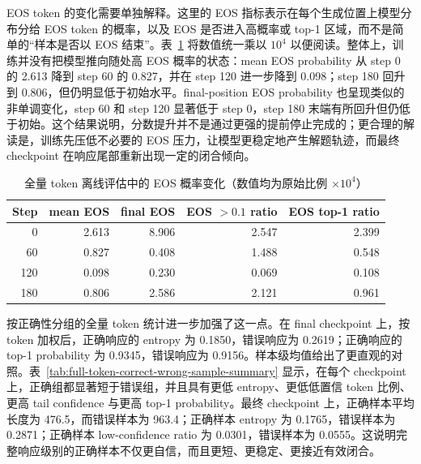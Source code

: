 EOS token 的变化需要单独解释。这里的 EOS 指标表示在每个生成位置上模型分布分给 EOS token 的概率，以及 EOS 是否进入高概率或 top-1 区域，而不是简单的“样本是否以 EOS 结束”。表~\ref{tab:full-token-eos-summary} 将数值统一乘以 $10^4$ 以便阅读。整体上，训练并没有把模型推向随处高 EOS 概率的状态：mean EOS probability 从 step 0 的 2.613 降到 step 60 的 0.827，并在 step 120 进一步降到 0.098；step 180 回升到 0.806，但仍明显低于初始水平。final-position EOS probability 也呈现类似的非单调变化，step 60 和 step 120 显著低于 step 0，step 180 末端有所回升但仍低于初始。这个结果说明，分数提升并不是通过更强的提前停止完成的；更合理的解读是，训练先压低不必要的 EOS 压力，让模型更稳定地产生解题轨迹，而最终 checkpoint 在响应尾部重新出现一定的闭合倾向。

\begin{table}[H]
    \centering
    \caption{全量 token 离线评估中的 EOS 概率变化（数值均为原始比例 $\times 10^4$）}
    \label{tab:full-token-eos-summary}
    \small
    \setlength{\tabcolsep}{5pt}
    \begin{tabular}{rrrrr}
        \toprule
        Step & mean EOS & final EOS & EOS $>0.1$ ratio & EOS top-1 ratio \\
        \midrule
        0 & 2.613 & 8.906 & 2.547 & 2.399 \\
        60 & 0.827 & 0.408 & 1.488 & 0.548 \\
        120 & 0.098 & 0.230 & 0.069 & 0.108 \\
        180 & 0.806 & 2.586 & 2.121 & 0.961 \\
        \bottomrule
    \end{tabular}
\end{table}

按正确性分组的全量 token 统计进一步加强了这一点。在 final checkpoint 上，按 token 加权后，正确响应的 entropy 为 0.1850，错误响应为 0.2619；正确响应的 top-1 probability 为 0.9345，错误响应为 0.9156。样本级均值给出了更直观的对照。表~\ref{tab:full-token-correct-wrong-sample-summary} 显示，在每个 checkpoint 上，正确组都显著短于错误组，并且具有更低 entropy、更低低置信 token 比例、更高 tail confidence 与更高 top-1 probability。最终 checkpoint 上，正确样本平均长度为 476.5，而错误样本为 963.4；正确样本 entropy 为 0.1765，错误样本为 0.2871；正确样本 low-confidence ratio 为 0.0301，错误样本为 0.0555。这说明完整响应级别的正确样本不仅更自信，而且更短、更稳定、更接近有效闭合。

